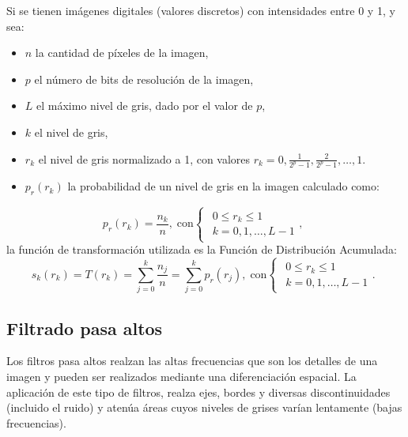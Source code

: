 Si se tienen imágenes digitales (valores discretos) con intensidades entre 0 y 1, y sea:
\begin{itemize}
 \item $n$ la cantidad de píxeles de la imagen,
 \item $p$ el número de bits de resolución de la imagen,
 \item $L$ el máximo nivel de gris, dado por el valor de $p$,
 \item $k$ el nivel de gris,
 \item $r_k$ el nivel de gris normalizado a 1, con valores $r_{k}=0,\frac{1}{2^{p}-1},\frac{2}{2^{p}-1},\ldots,1.$
 \item $p_{r}(r_{k})$ la probabilidad de un nivel de gris en la imagen calculado como:
\end{itemize}
\begin{equation}
p_{r}(r_{k})=\frac{n_{k}}{n},\; \textrm{con}\begin{cases}
\begin{array}{c}
0\leq r_{k}\leq1\\
k=0,1,\ldots,L-1
\end{array},\end{cases}\label{eq:relacion_probabilidades}
\end{equation}
la función de transformación utilizada es la Función de Distribución Acumulada:%
\begin{equation}
s_{k}(r_{k})=T(r_{k})=\sum_{j=0}^{k}\frac{n_{j}}{n}=\sum_{j=0}^{k}p_{r}(r_{j}),\; \textrm{con}\begin{cases}
\begin{array}{c}
0\leq r_{k}\leq1\\
k=0,1,\ldots,L-1
\end{array}.\end{cases}\label{eq:cdf_acumulada}
\end{equation}
\subsection{Filtrado pasa altos}
\label{suubsec:iluminacion_pasaaltos}
Los filtros pasa altos realzan las altas frecuencias que son los detalles de una imagen y pueden ser realizados mediante una diferenciación espacial. La aplicación de este tipo de filtros, realza ejes, bordes y diversas discontinuidades (incluido el ruido) y atenúa áreas cuyos niveles de grises varían lentamente (bajas frecuencias).

